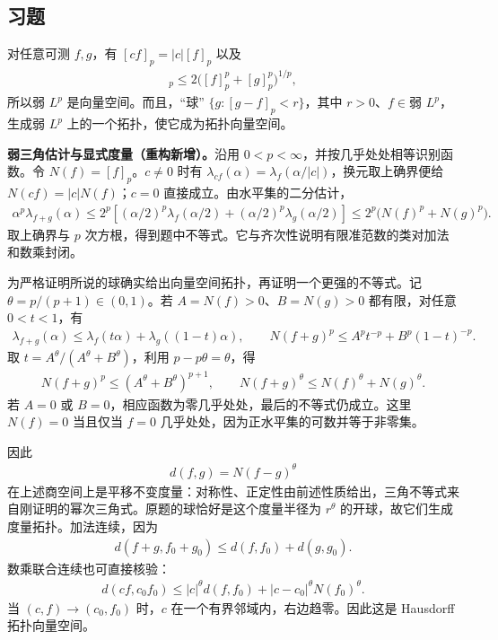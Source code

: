 \documentclass[../../main.tex]{subfiles}
\begin{document}
\subsection*{习题}
\begin{exercise}\label{exercise:ch06-weak-lp-topology}
对任意可测 $f,g$，有 $[cf]_p=|c|[f]_p$ 以及
\begin{align*}
[f+g]_p\leqslant2\bigl([f]_p^p+[g]_p^p\bigr)^{1/p},
\end{align*}
所以弱 $L^p$ 是向量空间。而且，“球” $\{g:[g-f]_p<r\}$，其中 $r>0$、$f\in\text{弱 }L^p$，生成弱 $L^p$ 上的一个拓扑，使它成为拓扑向量空间。
\end{exercise}
\begin{solution}
\textbf{弱三角估计与显式度量（重构新增）。}沿用 $0<p<\infty$，并按几乎处处相等识别函数。令 $N(f)=[f]_p$。$c\ne0$ 时有 $\lambda_{cf}(\alpha)=\lambda_f(\alpha/|c|)$，换元取上确界便给 $N(cf)=|c|N(f)$；$c=0$ 直接成立。由水平集的二分估计，
\begin{align*}
\alpha^p\lambda_{f+g}(\alpha)
\leqslant2^p\left[(\alpha/2)^p\lambda_f(\alpha/2)
+(\alpha/2)^p\lambda_g(\alpha/2)\right]
\leqslant2^p\bigl(N(f)^p+N(g)^p\bigr).
\end{align*}
取上确界与 $p$ 次方根，得到题中不等式。它与齐次性说明有限准范数的类对加法和数乘封闭。

为严格证明所说的球确实给出向量空间拓扑，再证明一个更强的不等式。记 $\theta=p/(p+1)\in(0,1)$。若 $A=N(f)>0$、$B=N(g)>0$ 都有限，对任意 $0<t<1$，有
\begin{align*}
\lambda_{f+g}(\alpha)\leqslant\lambda_f(t\alpha)+\lambda_g((1-t)\alpha),\qquad
N(f+g)^p\leqslant A^pt^{-p}+B^p(1-t)^{-p}.
\end{align*}
取 $t=A^\theta/(A^\theta+B^\theta)$，利用 $p-p\theta=\theta$，得
\begin{align*}
N(f+g)^p\leqslant(A^\theta+B^\theta)^{p+1},
\qquad N(f+g)^\theta\leqslant N(f)^\theta+N(g)^\theta.
\end{align*}
若 $A=0$ 或 $B=0$，相应函数为零几乎处处，最后的不等式仍成立。这里 $N(f)=0$ 当且仅当 $f=0$ 几乎处处，因为正水平集的可数并等于非零集。

因此
\begin{align*}
d(f,g)=N(f-g)^\theta
\end{align*}
在上述商空间上是平移不变度量：对称性、正定性由前述性质给出，三角不等式来自刚证明的幂次三角式。原题的球恰好是这个度量半径为 $r^\theta$ 的开球，故它们生成度量拓扑。加法连续，因为
\begin{align*}
d(f+g,f_0+g_0)\leqslant d(f,f_0)+d(g,g_0).
\end{align*}
数乘联合连续也可直接核验：
\begin{align*}
d(cf,c_0f_0)
\leqslant |c|^\theta d(f,f_0)+|c-c_0|^\theta N(f_0)^\theta.
\end{align*}
当 $(c,f)\to(c_0,f_0)$ 时，$c$ 在一个有界邻域内，右边趋零。因此这是 Hausdorff 拓扑向量空间。
\end{solution}
\end{document}
